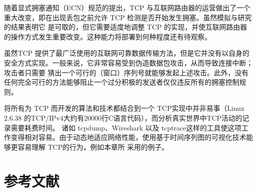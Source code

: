 随着显式拥塞通知（ECN）规范的提出，TCP 与互联网路由器的运营做出了一个重大改变，即在出现丢包之前允许 TCP 检测是否开始发生拥塞。虽然模拟与研究的结果表明它
是可取的，但它需要适度地调整 TCP 的实现，并使互联网路由器的操作方式发生重要改变。这种能力将部署到何种程度还有待观察。

虽然TCP 提供了最广泛使用的互联网可靠数据传输方法，但是它并没有以自身的安全方式实现。一般来说，它非常容易受到伪造数据包攻击，从而导致连接中断；攻击者只需要
猜出一个可行的（窗口）序列号就能够发起上述攻击。此外，没有任何完全可行的方法能够阻止一个过分积极的发送者仅仅违反所有的拥塞控制规则。


将所有为 TCP 而开发的算法和技术都结合到一个 TCP实现中并非易事（Linux 2.6.38 的TCP/IPv4大约有20000行C语言代码），而分析真实世界中TCP活动的记录需要耗费时间。
诸如 tcpdump、Wireshark 以及 tcptrace这样的工具使这项工作变得相对容易。由于动态地适应网络性能，使用基于时间序列图的可视化技术能够更容易理解 TCP的行为，例如本章所
采用的例子。

\section{参考文献}
